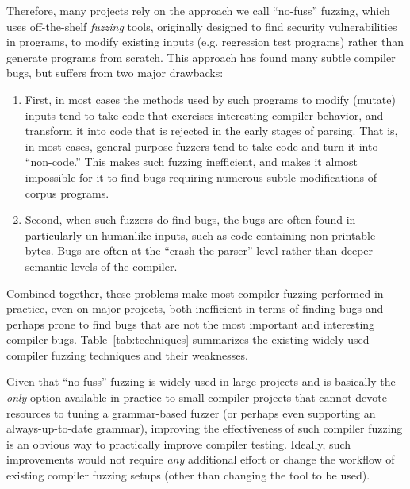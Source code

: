 Therefore, many projects rely on the approach we call ``no-fuss''
fuzzing, which uses off-the-shelf \emph{fuzzing} tools,
originally designed to find security vulnerabilities in programs, to
modify existing inputs (e.g. regression test programs) rather than generate programs from
scratch.  This approach has found many subtle compiler bugs, but
suffers from two major drawbacks:

\begin{enumerate}
\item First, in most cases the methods used by such programs to modify
  (mutate) inputs tend to take code that exercises interesting
  compiler behavior, and transform it into code that is rejected in
  the early stages of parsing.  That is, in most cases,
  general-purpose fuzzers tend to take code and turn it into
  ``non-code.''  This makes such fuzzing inefficient, and makes it
  almost impossible for it to find bugs requiring numerous subtle
  modifications of corpus programs.
  \item Second, when such fuzzers do find bugs, the bugs are often
    found in particularly un-humanlike inputs, such as code
    containing non-printable bytes.  Bugs are often at the ``crash the
    parser'' level rather than deeper semantic levels of the compiler.
  \end{enumerate}

  Combined together, these problems make most compiler fuzzing
  performed in practice, even on major projects, both inefficient in
  terms of finding bugs and perhaps prone to find bugs that are not
  the most important and interesting compiler bugs.
  Table~\ref{tab:techniques} summarizes the existing widely-used
  compiler fuzzing techniques and their weaknesses.

  Given that ``no-fuss'' fuzzing is widely used in large projects and
  is basically the \emph{only} option available in
  practice to small compiler projects that cannot devote resources to
  tuning a grammar-based fuzzer (or perhaps even supporting an
  always-up-to-date grammar), improving the effectiveness of such
  compiler fuzzing is an obvious way to practically improve compiler
  testing.  Ideally, such improvements would not require \emph{any}
  additional effort or change the workflow of existing compiler
  fuzzing setups (other than changing the  tool to be used).

